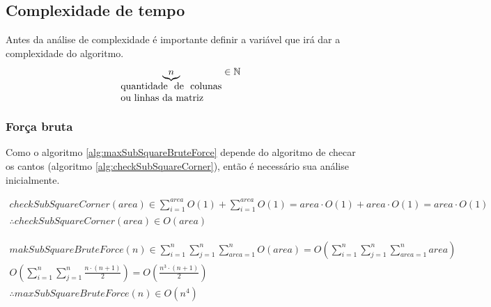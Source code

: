 \documentclass[10.9pt]{article}
\begin{document}
\subsection{Complexidade de tempo}
\label{sec:org4ac4d9d}
Antes da análise de complexidade é importante definir a variável que irá dar a complexidade do algoritmo.
\begin{equation}
\underbrace{n}_{\parbox{3.65cm}{quantidade de colunas ou linhas da matriz}} \in \mathbb{N}\\
\end{equation}
\subsubsection{Força bruta}
\label{sec:org638b97c}
Como o algoritmo \ref{alg:maxSubSquareBruteForce} depende do algoritmo de checar os cantos (algoritmo \ref{alg:checkSubSquareCorner}), então é necessário sua análise inicialmente.


\begin{equation}
\begin{aligned}\label{eq:checkSubSquareCorner}
checkSubSquareCorner(area)\in \sum_{i=1}^{area} O(1) + \sum_{i=1}^{area} O(1)=area\cdot O(1)+area\cdot O(1)=area\cdot O(1)\\
\therefore checkSubSquareCorner(area) \in O(area)
\end{aligned}
\end{equation}

\begin{equation}
\begin{aligned}
makSubSquareBruteForce(n)\in \sum_{i=1}^{n}\sum_{j=1}^{n}\sum_{area=1}^{n} O(area)=O(\sum_{i=1}^{n}\sum_{j=1}^{n}\sum_{area=1}^{n} area) \\
O(\sum_{i=1}^{n}\sum_{j=1}^{n} \frac{n\cdot (n+1)}{2}) = O(\frac{n^3\cdot (n+1)}{2}) \\
\therefore maxSubSquareBruteForce(n) \in O(n^4)
\end{aligned}
\end{equation}
\end{document}
